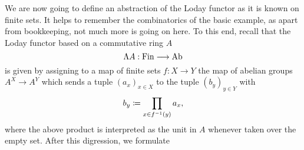   We are now going to define an abstraction of the Loday functor as it is
  known on finite sets. It helps to remember the combinatorics of the basic
  example, as apart from bookkeeping, not much more is going on here. To this
  end, recall that the Loday functor based on a commutative ring $A$
  \begin{displaymath}
    \Lambda A: \mathrm{Fin} \longrightarrow \mathrm{Ab}
  \end{displaymath}
  is given by assigning to a map of finite sets $f: X \to Y$ the map of
  abelian groups $A^X \to A^Y$ which sends a tuple $(a_x)_{x \in X}$ to the
  tuple $(b_y)_{y \in Y}$ with 
  \begin{displaymath}
    b_y \coloneqq \prod_{x \in f^{-1}(y)} a_x,
  \end{displaymath}
  where the above product is interpreted as the unit in $A$ whenever taken
  over the empty set. After this digression, we formulate
